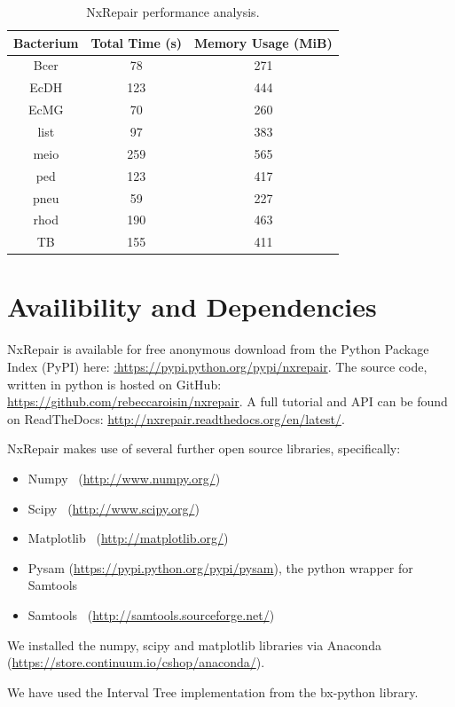 \documentclass[12pt]{article}
\begin{document}
\begin{table}
\begin{center}
\begin{tabular}{|c|c|c|}
    \hline
    Bacterium & Total Time (s) & Memory Usage (MiB) \\ \hline
    Bcer & 78 & 271 \\
    EcDH & 123 & 444 \\
    EcMG & 70 & 260 \\
    list & 97 & 383 \\
    meio & 259 & 565 \\
    ped & 123 & 417 \\
    pneu & 59 & 227 \\
    rhod & 190 & 463 \\
    TB & 155 & 411 \\ 
    \hline
\end{tabular}
\end{center}
\caption{NxRepair performance analysis. \label{tab:performance}}
\end{table}

\clearpage

\section{Availibility and Dependencies}
NxRepair is available for free anonymous download from the Python Package Index (PyPI) here: \url{:https://pypi.python.org/pypi/nxrepair}.
The source code, written in python is hosted on GitHub: \url{https://github.com/rebeccaroisin/nxrepair}.
A full tutorial and API can be found on ReadTheDocs: \url{http://nxrepair.readthedocs.org/en/latest/}.

NxRepair makes use of several further open source libraries, specifically:

\begin{itemize}
\item[] Numpy~\cite{numpy} (\url{http://www.numpy.org/})
\item[] Scipy~\cite{scipy} (\url{http://www.scipy.org/})
\item[] Matplotlib~\cite{Hunter2007} (\url{http://matplotlib.org/})
\item[] Pysam (\url{https://pypi.python.org/pypi/pysam}), the python wrapper for Samtools
\item[] Samtools~\cite{li2009} (\url{http://samtools.sourceforge.net/})
\end{itemize}

We installed the numpy, scipy and matplotlib libraries via Anaconda (\url{https://store.continuum.io/cshop/anaconda/}).

We have used the Interval Tree implementation from the bx-python library.

\clearpage


\end{document}
